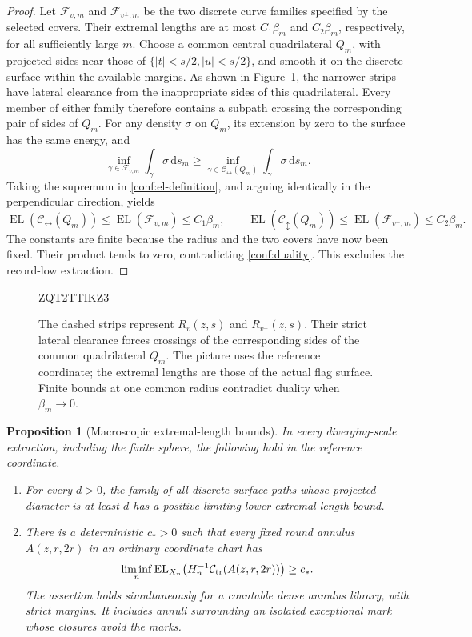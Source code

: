 \documentclass[11pt]{article}
\numberwithin{equation}{section}
\newtheorem{proposition}[theorem]{Proposition}
\theoremstyle{definition}
\theoremstyle{remark}
\newcommand{\1}{\mathbf 1}
\begin{document}
\begin{proof}
Let \(\mathcal F_{v,m}\) and \(\mathcal F_{v^\perp,m}\) be the
two discrete curve families specified by the selected covers.
Their extremal lengths are at most \(C_1\beta_m\) and
\(C_2\beta_m\), respectively, for all sufficiently large \(m\).
Choose a common central quadrilateral \(Q_m\), with projected
sides near those of \(\{|t|<s/2,|u|<s/2\}\), and smooth it on
the discrete surface within the available margins.  As shown in
Figure~\ref{conf:transverse-figure}, the narrower strips have lateral
clearance from the inappropriate sides of this quadrilateral.  Every
member of either family therefore contains a subpath crossing the
corresponding pair of sides of \(Q_m\).  For any density \(\sigma\) on
\(Q_m\), its extension by zero to the surface has the same energy,
and
\[
 \inf_{\gamma\in\mathcal F_{v,m}}\int_\gamma\sigma\,\mathrm d s_m
 \ge
 \inf_{\gamma\in\mathcal C_{\leftrightarrow}(Q_m)}
                       \int_\gamma\sigma\,\mathrm d s_m.
\]
Taking the supremum in \eqref{conf:el-definition}, and arguing
identically in the perpendicular direction, yields
\[
 \operatorname{EL}(\mathcal C_{\leftrightarrow}(Q_m))
       \le\operatorname{EL}(\mathcal F_{v,m})\le C_1\beta_m,
 \qquad
 \operatorname{EL}(\mathcal C_{\updownarrow}(Q_m))
       \le\operatorname{EL}(\mathcal F_{v^\perp,m})\le C_2\beta_m.
\]
The constants are finite because the radius and the two covers
have now been fixed.  Their product
tends to zero, contradicting \eqref{conf:duality}.  This excludes the
record-low extraction.
\end{proof}

\begin{figure}[tb]

ZQT2TTIKZ3

\caption{The dashed strips represent \(R_v(z,s)\) and
\(R_{v^\perp}(z,s)\).  Their strict lateral clearance forces
crossings of the corresponding sides of the common quadrilateral
\(Q_m\).  The picture uses the reference coordinate; the extremal lengths are those of the actual flag surface.
Finite bounds at one common radius contradict duality when
\(\beta_m\to0\).}
\label{conf:transverse-figure}
\end{figure}

\begin{proposition}[Macroscopic extremal-length bounds]
\label{conf:macroscopic-el}
In every diverging-scale extraction, including the finite sphere,
the following hold in the reference coordinate.
\begin{enumerate}
\item For every \(d>0\), the family of all discrete-surface paths
whose projected diameter is at least \(d\) has a positive limiting
lower extremal-length bound.
\item There is a deterministic \(c_*>0\) such that every fixed
round annulus \(A(z,r,2r)\) in an ordinary coordinate chart has
\[
 \liminf_n\operatorname{EL}_{X_n}\bigl(H_n^{-1}
                   \mathcal C_{\rm tr}(A(z,r,2r))\bigr)\ge c_*.
\]
The assertion holds simultaneously for a countable dense annulus
library, with strict margins.  It includes annuli surrounding an
isolated exceptional mark whose closures avoid the marks.
\end{enumerate}
\end{proposition}
\end{document}
